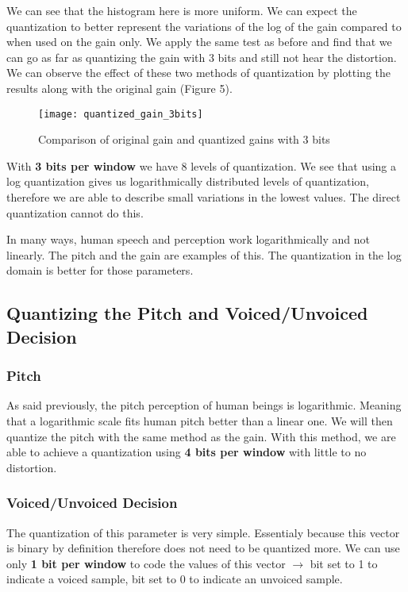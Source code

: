 We can see that the histogram here is more uniform. We can expect the quantization to better represent the variations of the log of the gain
compared to when used on the gain only. We apply the same test as before and find that we can go as far as quantizing the gain with 3 bits
and still not hear the distortion. We can observe the effect of these two methods of quantization by plotting the results along with the original
gain (Figure 5).

\begin{figure}[h!]
\centering
\texttt{[image: quantized\_gain\_3bits]}
\caption{Comparison of original gain and quantized gains with 3 bits}
\label{histloggain}
\end{figure}

With \textbf{3 bits per window} we have 8 levels of quantization. We see that using a log quantization gives us logarithmically distributed levels of quantization,
therefore we are able to describe small variations in the lowest values. The direct quantization cannot do this.

In many ways, human speech and perception work logarithmically and not linearly. The pitch and the gain are examples of this. The quantization
in the log domain is better for those parameters.

\subsection{Quantizing the Pitch and Voiced/Unvoiced Decision}

\subsubsection*{Pitch}

As said previously, the pitch perception of human beings is logarithmic. Meaning that a logarithmic scale fits human pitch better than a linear one.
We will then quantize the pitch with the same method as the gain. With this method, we are able to achieve a quantization using \textbf{4 bits per window} with
little to no distortion.

\subsubsection*{Voiced/Unvoiced Decision}

The quantization of this parameter is very simple. Essentialy because this vector is binary by definition therefore does not need to be quantized more.
We can use only \textbf{1 bit per window} to code the values of this vector $\rightarrow$ bit set to 1 to indicate a voiced sample, bit set to 0 to indicate an unvoiced sample.

